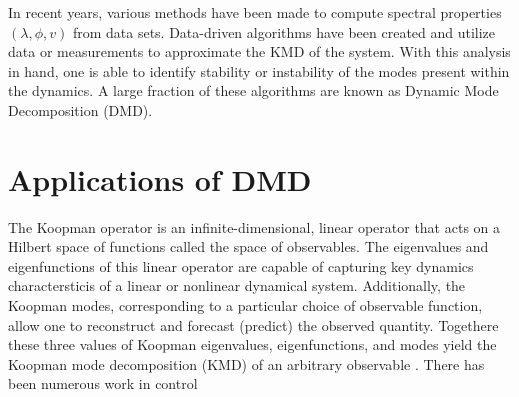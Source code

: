 \documentclass{article}
\begin{document}
In recent years, various methods have been made to compute spectral properties $(\lambda,\phi,v)$ from data sets. Data-driven algorithms have been created and utilize data or measurements to approximate the KMD of the system. With this analysis in hand, one is able to identify stability or instability of the modes present within the dynamics. A large fraction of these algorithms are known as Dynamic Mode Decomposition (DMD). 

\newpage
\section*{Applications of DMD}
The Koopman operator is an infinite-dimensional, linear operator that acts on a Hilbert space of functions called the space of observables. The eigenvalues and eigenfunctions of this linear operator are capable of capturing key dynamics charactersticis of a linear or nonlinear dynamical system. Additionally, the Koopman modes, corresponding to a particular choice of observable function, allow one to reconstruct and forecast (predict) the observed quantity. Togethere these three values of Koopman eigenvalues, eigenfunctions, and modes yield the Koopman mode decomposition (KMD) of an arbitrary observable \autocite[4]{arbabi2017study}. There has been numerous work in control \autocite[5]{arbabi2018data} \autocite[6]{KORDA2018149}\
\end{document}
